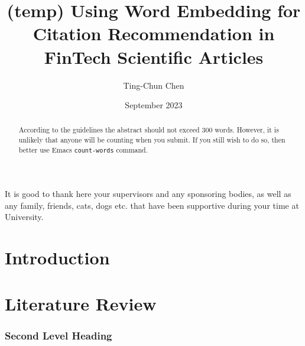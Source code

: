 \documentclass[11pt]{uonthesis}
\title{(temp) Using Word Embedding for Citation Recommendation 
in FinTech Scientific Articles}
\author{Ting-Chun Chen}
\date{September 2023}
\begin{document}
\begin{frontmatter}
\maketitle
\tableofcontents

\begin{abstract}
According to the guidelines the abstract should not exceed 300 words.
However, it is unlikely that anyone will be counting when you submit.
If you still wish to do so, then better use Emacs \verb|count-words|
command.
\end{abstract}

\begin{acknowledgements}
It is good to thank here your supervisors and any sponsoring bodies,
as well as any family, friends, cats, dogs etc. that have been
supportive during your time at University.
\end{acknowledgements}


\end{frontmatter}

\chapter{Introduction}


\chapter{Literature Review}






\subsection{Second Level Heading}
\end{document}

